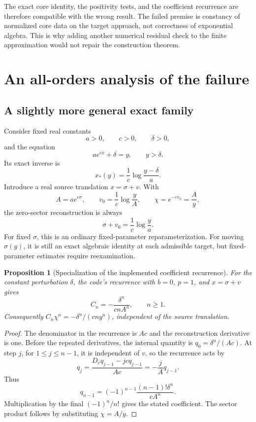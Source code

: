 \documentclass[11pt,letterpaper]{article}
\newtheorem{proposition}{Proposition}
\begin{document}
The exact core identity, the positivity tests, and the coefficient recurrence are therefore compatible with the wrong result. The failed premise is constancy of normalized core data on the target approach, not correctness of exponential algebra. This is why adding another numerical residual check to the finite approximation would not repair the construction theorem.

\section{An all-orders analysis of the failure}
\subsection{A slightly more general exact family}
Consider fixed real constants
\[
 a>0,\qquad c>0,\qquad \delta>0,
\]
and the equation
\begin{equation}\label{eq:general}
 a e^{cx}+\delta=y,\qquad y>\delta.
\end{equation}
Its exact inverse is
\[
 x_*(y)=\frac1c\log\frac{y-\delta}{a}.
\]
Introduce a real source translation $x=\sigma+v$. With
\[
 A=a e^{c\sigma},\qquad
 v_0=\frac1c\log\frac{y}{A},\qquad
 \chi=e^{-cv_0}=\frac{A}{y},
\]
the zero-sector reconstruction is always
\[
 \sigma+v_0=\frac1c\log\frac{y}{a}.
\]
For fixed $\sigma$, this is an ordinary fixed-parameter reparameterization. For moving $\sigma(y)$, it is still an exact algebraic identity at each admissible target, but fixed-parameter estimates require reexamination.

\begin{proposition}[Specialization of the implemented coefficient recurrence]\label{prop:coeff}
For the constant perturbation $\delta$, the code's recurrence with $b=0$, $p=1$, and $x=\sigma+v$ gives
\[
 C_n=-\frac{\delta^n}{c n A^n},\qquad n\geq1.
\]
Consequently $C_n\chi^n=-\delta^n/(c n y^n)$, independent of the source translation.
\end{proposition}
\begin{proof}
The denominator in the recurrence is $Ac$ and the reconstruction derivative is one. Before the repeated derivatives, the internal quantity is $q_0=\delta^n/(Ac)$. At step $j$, for $1\leq j\leq n-1$, it is independent of $v$, so the recurrence acts by
\[
 q_j=\frac{D_v q_{j-1}-jcq_{j-1}}{Ac}
     =-\frac{j}{A}q_{j-1}.
\]
Thus
\[
 q_{n-1}=(-1)^{n-1}\frac{(n-1)!\delta^n}{cA^n}.
\]
Multiplication by the final $(-1)^n/n!$ gives the stated coefficient. The sector product follows by substituting $\chi=A/y$.
\end{proof}
\end{document}
